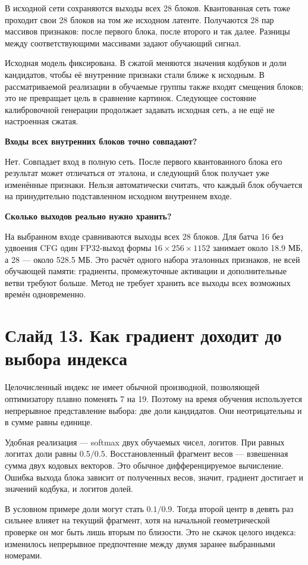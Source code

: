 \documentclass[a4paper,11pt]{article}
\newcommand{\slide}[2]{\clearpage\section*{Слайд #1. #2}}
\newcommand{\question}[1]{\par\textbf{#1}\par}
\begin{document}
В исходной сети сохраняются выходы всех 28 блоков.
Квантованная сеть тоже проходит свои 28 блоков на том же исходном
латенте. Получаются 28 пар массивов признаков: после первого блока,
после второго и так далее. Разницы между соответствующими массивами
задают обучающий сигнал.

Исходная модель фиксирована. В сжатой меняются значения кодбуков
и доли кандидатов, чтобы её внутренние признаки стали ближе
к исходным. В рассматриваемой реализации в обучаемые группы также
входят смещения блоков; это не превращает цель в сравнение картинок.
Следующее состояние калибровочной генерации продолжает задавать
исходная сеть, а не ещё не настроенная сжатая.

\question{Входы всех внутренних блоков точно совпадают?}
Нет. Совпадает вход в полную сеть. После первого квантованного блока
его результат может отличаться от эталона, и следующий блок получает
уже изменённые признаки. Нельзя автоматически считать, что каждый
блок обучается на принудительно подставленном исходном внутреннем входе.

\question{Сколько выходов реально нужно хранить?}
На выбранном входе сравниваются выходы всех 28 блоков. Для батча 16
без удвоения CFG один FP32-выход формы $16\times256\times1152$
занимает около 18.9 МБ, а 28 --- около 528.5 МБ. Это расчёт одного
набора эталонных признаков, не всей обучающей памяти: градиенты,
промежуточные активации и дополнительные ветви требуют больше.
Метод не требует хранить все выходы всех возможных времён одновременно.

\slide{13}{Как градиент доходит до выбора индекса}
Целочисленный индекс не имеет обычной производной, позволяющей
оптимизатору плавно поменять 7 на 19. Поэтому на время обучения
используется непрерывное представление выбора: две доли кандидатов.
Они неотрицательны и в сумме равны единице.

Удобная реализация --- softmax двух обучаемых чисел, логитов.
При равных логитах доли равны $0.5/0.5$.
Восстановленный фрагмент весов --- взвешенная сумма двух кодовых
векторов. Это обычное дифференцируемое вычисление. Ошибка выхода
блока зависит от полученных весов, значит, градиент достигает
и значений кодбука, и логитов долей.

В условном примере доли могут стать $0.1/0.9$.
Тогда второй центр в девять раз сильнее влияет на текущий фрагмент,
хотя на начальной геометрической проверке он мог быть лишь вторым
по близости. Это не скачок целого индекса: изменилось непрерывное
предпочтение между двумя заранее выбранными номерами.
\end{document}
